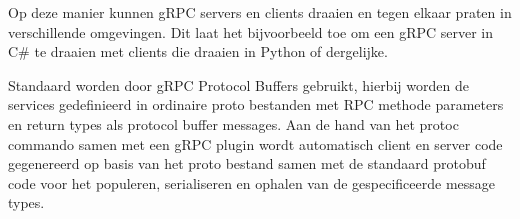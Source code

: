 Op deze manier kunnen gRPC servers en clients draaien en tegen elkaar praten in verschillende omgevingen. Dit laat het bijvoorbeeld toe om een gRPC server in C\# te draaien met clients die draaien in Python of dergelijke.

Standaard worden door gRPC Protocol Buffers gebruikt, hierbij worden de services gedefinieerd in ordinaire proto bestanden met RPC methode parameters en return types als protocol buffer messages. Aan de hand van het protoc commando samen met een gRPC plugin wordt automatisch client en server code gegenereerd op basis van het proto bestand samen met de standaard protobuf code voor het populeren, serialiseren en ophalen van de gespecificeerde message types.






